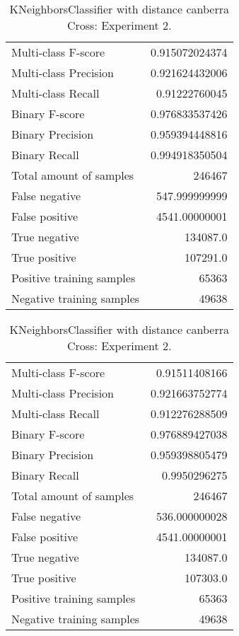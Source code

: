 \begin{table}[H]
\begin{minipage}{0.5\textwidth}
\caption{KNeighborsClassifier with distance canberra Cross: Experiment 1.}
\centering
\begin{tabular}{l r}
\toprule
Multi-class F-score & 0.915072024374 \\
Multi-class Precision & 0.921624432006 \\
Multi-class Recall & 0.91222760045 \\
\midrule
Binary F-score & 0.976833537426 \\
Binary Precision & 0.959394448816 \\
Binary Recall & 0.994918350504 \\
\midrule
Total amount of samples & 246467 \\
False negative & 547.999999999 \\
False positive & 4541.00000001 \\
True negative & 134087.0 \\
True positive & 107291.0 \\
\midrule
Positive training samples & 65363 \\
Negative training samples & 49638 \\
\bottomrule
\end{tabular}
\end{minipage}
\hfillx
\begin{minipage}{0.5\textwidth}
\caption{KNeighborsClassifier with distance canberra Cross: Experiment 2.}
\centering
\begin{tabular}{l r}
\toprule
Multi-class F-score & 0.91511408166 \\
Multi-class Precision & 0.921663752774 \\
Multi-class Recall & 0.912276288509 \\
\midrule
Binary F-score & 0.976889427038 \\
Binary Precision & 0.959398805479 \\
Binary Recall & 0.9950296275 \\
\midrule
Total amount of samples & 246467 \\
False negative & 536.000000028 \\
False positive & 4541.00000001 \\
True negative & 134087.0 \\
True positive & 107303.0 \\
\midrule
Positive training samples & 65363 \\
Negative training samples & 49638 \\
\bottomrule
\end{tabular}
\end{minipage}
\end{table}

